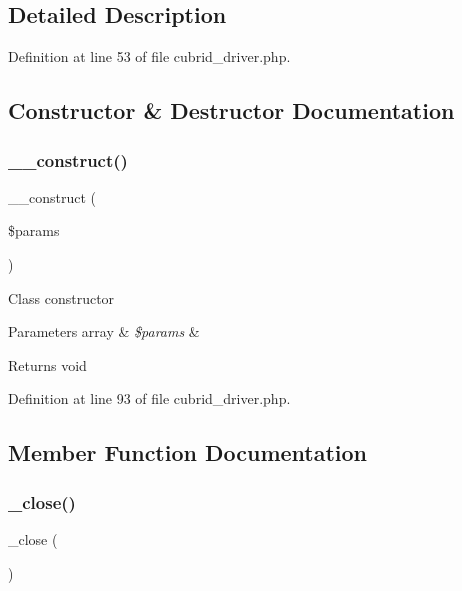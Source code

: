\subsection{Detailed Description}


Definition at line 53 of file cubrid\+\_\+driver.\+php.



\subsection{Constructor \& Destructor Documentation}
\mbox{\label{class_c_i___d_b__cubrid__driver_a9162320adff1a1a4afd7f2372f753a3e}} 
\subsubsection{\texorpdfstring{\_\_construct()}{\_\_construct()}}
{\footnotesize\ttfamily \+\_\+\+\_\+construct (\begin{DoxyParamCaption}\item[{}]{\$params }\end{DoxyParamCaption})}

Class constructor


\begin{DoxyParams}[1]{Parameters}
array & {\em \$params} & \\
\hline
\end{DoxyParams}
\begin{DoxyReturn}{Returns}
void 
\end{DoxyReturn}


Definition at line 93 of file cubrid\+\_\+driver.\+php.



\subsection{Member Function Documentation}
\mbox{\label{class_c_i___d_b__cubrid__driver_a4d9082658000e5ede8312067c6dda9db}} 
\subsubsection{\texorpdfstring{\_close()}{\_close()}}
{\footnotesize\ttfamily \+\_\+close (\begin{DoxyParamCaption}{ }\end{DoxyParamCaption})\hspace{0.3cm}{\ttfamily [protected]}}


